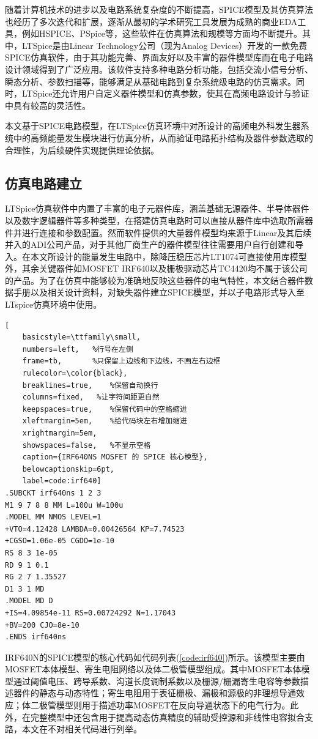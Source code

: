 随着计算机技术的进步以及电路系统复杂度的不断提高，SPICE模型及其仿真算法也经历了多次迭代和扩展，逐渐从最初的学术研究工具发展为成熟的商业EDA工具，例如HSPICE、PSpice等，这些软件在仿真算法和规模等方面均不断提升。其中，LTSpice是由Linear Technology公司（现为Analog Devices）开发的一款免费SPICE仿真软件，由于其功能完善、界面友好以及丰富的器件模型库而在电子电路设计领域得到了广泛应用。该软件支持多种电路分析功能，包括交流小信号分析、瞬态分析、参数扫描等，能够满足从基础电路到复杂系统级电路的仿真需求。同时，LTSpice还允许用户自定义器件模型和仿真参数，使其在高频电路设计与验证中具有较高的灵活性。

本文基于SPICE电路模型，在LTSpice仿真环境中对所设计的高频电外科发生器系统中的高频能量发生模块进行仿真分析，从而验证电路拓扑结构及器件参数选取的合理性，为后续硬件实现提供理论依据。

\subsection{仿真电路建立}
LTSpice仿真软件中内置了丰富的电子元器件库，涵盖基础无源器件、半导体器件以及数字逻辑器件等多种类型，在搭建仿真电路时可以直接从器件库中选取所需器件并进行连接和参数配置。然而软件提供的大量器件模型均来源于Linear及其后续并入的ADI公司产品，对于其他厂商生产的器件模型往往需要用户自行创建和导入。在本文所设计的能量发生电路中，除降压稳压芯片LT1074可直接使用库模型外，其余关键器件如MOSFET IRF640以及栅极驱动芯片TC4420均不属于该公司的产品。为了在仿真中能够较为准确地反映这些器件的电气特性，本文结合器件数据手册以及相关设计资料，对缺失器件建立SPICE模型，并以子电路形式导入至LTspice仿真环境中使用。

\begin{lstlisting}[
    basicstyle=\ttfamily\small,
    numbers=left,   %行号在左侧
    frame=tb,       %只保留上边线和下边线，不画左右边框
    rulecolor=\color{black},
    breaklines=true,    %保留自动换行
    columns=fixed,   %让字符间距更自然
    keepspaces=true,    %保留代码中的空格缩进
    xleftmargin=5em,    %给代码块左右增加缩进
    xrightmargin=5em,
    showspaces=false,   %不显示空格
    caption={IRF640NS MOSFET 的 SPICE 核心模型},
    belowcaptionskip=6pt,
    label=code:irf640]
.SUBCKT irf640ns 1 2 3
M1 9 7 8 8 MM L=100u W=100u
.MODEL MM NMOS LEVEL=1
+VTO=4.12428 LAMBDA=0.00426564 KP=7.74523
+CGSO=1.06e-05 CGDO=1e-10
RS 8 3 1e-05
RD 9 1 0.1
RG 2 7 1.35527
D1 3 1 MD
.MODEL MD D
+IS=4.09854e-11 RS=0.00724292 N=1.17043
+BV=200 CJO=8e-10
.ENDS irf640ns
\end{lstlisting}

IRF640N的SPICE模型的核心代码如代码列表(\ref{code:irf640})所示。该模型主要由MOSFET本体模型、寄生电阻网络以及体二极管模型组成。其中MOSFET本体模型通过阈值电压、跨导系数、沟道长度调制系数以及栅源/栅漏寄生电容等参数描述器件的静态与动态特性；寄生电阻用于表征栅极、漏极和源极的非理想导通效应；体二极管模型则用于描述功率MOSFET在反向导通状态下的电气行为。此外，在完整模型中还包含用于提高动态仿真精度的辅助受控源和非线性电容拟合支路，本文在不对相关代码进行列举。

